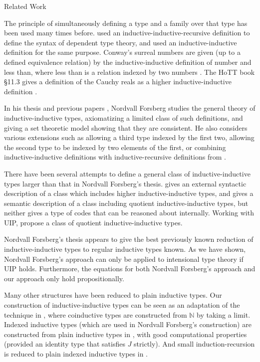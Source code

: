 \documentclass[runningheads]{llncs}
\newcommand{\N}{\mathbb{N}}
\def\Forsberg/{Nordvall Forsberg}
\begin{document}
\begin{section}{Related Work}

The principle of simultaneously defining a type and a family over that type has been used many times before. \citet{danielssonIRdeptype} used an inductive-inductive-recursive definition to define the syntax of dependent type theory, and \citet{CHAPMAN200921} used an inductive-inductive definition for the same purpose. Conway's surreal numbers \citep{conway2000numbers} are given (up to a defined equivalence relation) by the inductive-inductive definition of number and less than, where less than is a relation indexed by two numbers \citep[\S7.1]{nordvallforsberg2013thesis}. The HoTT book \S11.3 gives a definition of the Cauchy reals as a higher inductive-inductive definition \citep{hottbook}.

In his thesis and previous papers \citep{nordvallforsberg2013thesis,nordvallforsbergSetzer2010inductiveinductive,nordvallforsbergSetzer2012finIndind}, \Forsberg/ studies the general theory of inductive-inductive types, axiomatizing a limited class of such definitions, and giving a set theoretic model showing that they are consistent. He also considers various extensions such as allowing a third type indexed by the first two, allowing the second type to be indexed by two elements of the first, or combining inductive-inductive definitions with inductive-recursive definitions from \citet{finiteaxiomatizationIR}.

There have been several attempts to define a general class of inductive-inductive types larger than that in \Forsberg/'s thesis. \citet{KaposiKovacsHIITsyntax} gives an external syntactic description of a class which includes higher inductive-inductive types, and \citet{Altenkirch2018QuotientITsemantics} gives a semantic description of a class including quotient inductive-inductive types, but neither gives a type of codes that can be reasoned about internally. Working with UIP, \citet{AltenkirchKaposiKovacsConstructingQIITs} propose a class of quotient inductive-inductive types.

\Forsberg/'s thesis \citep{nordvallforsberg2013thesis} appears to give the best previously known reduction of inductive-inductive types to regular inductive types known. As we have shown, \Forsberg/'s approach can only be applied to intensional type theory if UIP holds. Furthermore, the equations for both \Forsberg/'s approach and our approach only hold propositionally.

Many other structures have been reduced to plain inductive types. Our construction of inductive-inductive types can be seen as an adaptation of the technique in \citet{nonwellfoundedtrees}, where coinductive types are constructed from $\N$ by taking a limit. Indexed inductive types (which are used in \Forsberg/'s construction) are constructed from plain inductive types in \citet{altenkirch2015indexed}, with good computational properties (provided an identity type that satisfies $J$ strictly). And small induction-recursion is reduced to plain indexed inductive types in \citet{alti:tlca13-small-ir}.

\end{section}
\end{document}
